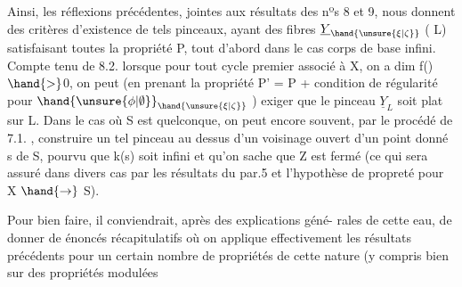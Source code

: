 Ainsi, les réflexions précédentes, jointes aux résultats des nºs 8 et 9,
nous donnent des critères d'existence de tels pinceaux, ayant des fibres
$\underline{Y}_{\hand{\unsure{\xi|\zeta}}}$ ( \hand{$\unsure{\xi|\zeta} \in$}L) satisfaisant toutes la propriété P, tout d'abord dans le
cas   corps de base infini.  Compte tenu de
8.2.\hand{,} lorsque  pour tout cycle premier associé à X, on a dim f()$\hand{>}$0,
on peut (en prenant la propriété P' = P + condition de régularité
pour $\hand{\unsure{\phi|\emptyset}}_{\hand{\unsure{\xi|\zeta}}}$ ) exiger que le pinceau $\underline{Y}_L$ soit plat sur L. Dans le cas
où S est quelconque, on peut encore souvent, par le procédé de 7.1. ,
construire un tel pinceau au dessus d'un voisinage ouvert d'un point
donné s de S, pourvu que k(s) soit infini et qu'on sache que Z est fermé
(ce qui sera assuré dans divers cas par les résultats du par.5 et
l'hypothèse de propreté pour X $\hand{\rightarrow}$ S).

 Pour bien faire, il conviendrait, après des explications géné-%
rales de cette eau, de donner de énoncés récapitulatifs où on
applique effectivement les résultats précédents pour un certain nombre
de propriétés de cette nature (y compris bien sur des propriétés modulées\hand{)}

